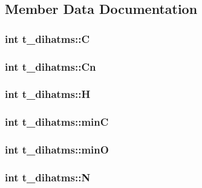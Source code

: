 \subsection{\-Member \-Data \-Documentation}
\hypertarget{structt__dihatms_ac2a7f5fd48a903a5b7be6b55e5b5d9c7}{
\subsubsection[{\-C}]{\setlength{\rightskip}{0pt plus 5cm}int {\bf t\-\_\-dihatms\-::\-C}}}\label{structt__dihatms_ac2a7f5fd48a903a5b7be6b55e5b5d9c7}
\hypertarget{structt__dihatms_a45173b30e3c6752194fda734fd83a21a}{
\subsubsection[{\-Cn}]{\setlength{\rightskip}{0pt plus 5cm}int {\bf t\-\_\-dihatms\-::\-Cn}}}\label{structt__dihatms_a45173b30e3c6752194fda734fd83a21a}
\hypertarget{structt__dihatms_ab5e41a46124a1ec771c730a038414055}{
\subsubsection[{\-H}]{\setlength{\rightskip}{0pt plus 5cm}int {\bf t\-\_\-dihatms\-::\-H}}}\label{structt__dihatms_ab5e41a46124a1ec771c730a038414055}
\hypertarget{structt__dihatms_acfe19da78b520250a3184f1abc22f8ff}{
\subsubsection[{min\-C}]{\setlength{\rightskip}{0pt plus 5cm}int {\bf t\-\_\-dihatms\-::min\-C}}}\label{structt__dihatms_acfe19da78b520250a3184f1abc22f8ff}
\hypertarget{structt__dihatms_af54ad91da23217079e3894a0a48da337}{
\subsubsection[{min\-O}]{\setlength{\rightskip}{0pt plus 5cm}int {\bf t\-\_\-dihatms\-::min\-O}}}\label{structt__dihatms_af54ad91da23217079e3894a0a48da337}
\hypertarget{structt__dihatms_a0c2034f5cb4a3d4781bf4aabf47609b4}{
\subsubsection[{\-N}]{\setlength{\rightskip}{0pt plus 5cm}int {\bf t\-\_\-dihatms\-::\-N}}}\label{structt__dihatms_a0c2034f5cb4a3d4781bf4aabf47609b4}
